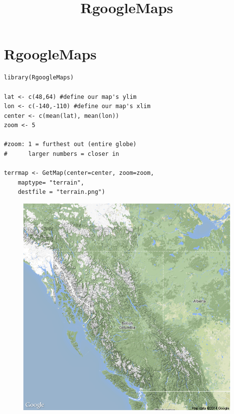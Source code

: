 \documentclass[]{article}
\title{RgoogleMaps}
\begin{document}

\section{RgoogleMaps}

\begin{framed}
\begin{verbatim}
library(RgoogleMaps)

lat <- c(48,64) #define our map's ylim
lon <- c(-140,-110) #define our map's xlim
center <- c(mean(lat), mean(lon))  
zoom <- 5  

#zoom: 1 = furthest out (entire globe)   
#      larger numbers = closer in

terrmap <- GetMap(center=center, zoom=zoom, 
    maptype= "terrain", 
    destfile = "terrain.png") 
\end{verbatim}
\end{framed}
\begin{figure}[h!]
\centering
\includegraphics[width=0.9\linewidth]{./terrain}
\label{fig:terrain}
\end{figure}
\end{document}

